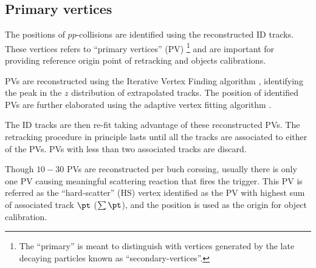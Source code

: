 \subsection{Primary vertices} \label{sec::objDef::PV}
The positions of $pp$-collisions are identified using the reconstructed ID tracks. These vertices refers to ``primary vertices'' (PV) 
\footnote{The ``primary'' is meant to distinguish with vertices generated by the late decaying particles known as ``secondary-vertices''.}
and are important for providing reference origin point of retracking and objects calibrations.

PVs are reconstructed using the Iterative Vertex Finding algorithm \cite{134_vertexing_Run1}\cite{135_vertexing_Run1_2012}, identifying the peak in the $z$ distribution of extrapolated tracks. The position of identified PVs are further elaborated using the adaptive vertex fitting algorithm \cite{136_adaVertexFit}.

The ID tracks are then re-fit taking advantage of these reconstructed PVs. The retracking procedure in principle lasts until all the tracks are associated to either of the PVs. PVs with less than two associated tracks are discard. 

Though $10-30$ PVs are reconstructed per buch corssing, usually there is only one PV causing meaningful scattering reaction that fires the trigger. This PV is referred as the ``hard-scatter'' (HS) vertex  identified as the PV with highest sum of associated track $\pt$ ($\sum\pt$), and the position is used as the origin for object calibration. \\






